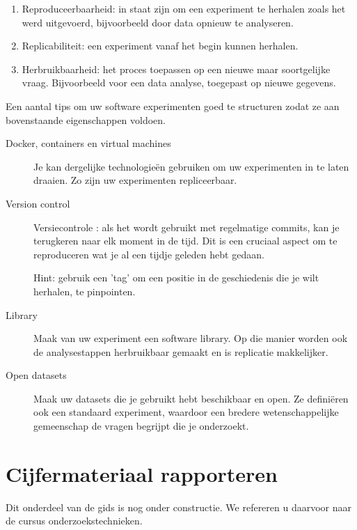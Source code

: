\begin{enumerate}
	\item Reproduceerbaarheid: in staat zijn om een experiment te herhalen zoals het werd uitgevoerd, bijvoorbeeld door data opnieuw te analyseren.
	\item Replicabiliteit: een experiment vanaf het begin kunnen herhalen.
	\item Herbruikbaarheid: het proces toepassen op een nieuwe maar soortgelijke vraag. Bijvoorbeeld voor een data analyse, toegepast op nieuwe gegevens.
\end{enumerate}

Een aantal tips om uw software experimenten goed te structuren zodat ze aan bovenstaande eigenschappen voldoen.

\begin{description}
	\item[Docker, containers en virtual machines] Je kan dergelijke technologieën gebruiken om uw experimenten in te laten draaien. Zo zijn uw experimenten repliceerbaar.
	\item[Version control] Versiecontrole : als het wordt gebruikt met regelmatige commits, kan je terugkeren naar elk moment in de tijd. Dit is een cruciaal aspect  om te reproduceren wat je al een tijdje geleden hebt gedaan.
	
	Hint: gebruik een 'tag' om een positie in de geschiedenis die je wilt herhalen, te pinpointen.
	\item[Library] Maak van uw experiment een software library. Op die manier worden ook de analysestappen herbruikbaar gemaakt en is replicatie makkelijker. 
	\item[Open datasets] Maak uw datasets die je gebruikt hebt beschikbaar en open. Ze definiëren ook een standaard experiment, waardoor een bredere wetenschappelijke gemeenschap de vragen begrijpt die je onderzoekt.
\end{description}



\section{Cijfermateriaal rapporteren}
\label{sec:cijfermateriaal}
Dit onderdeel van de gids is nog onder constructie. We refereren u daarvoor naar de cursus onderzoekstechnieken.


